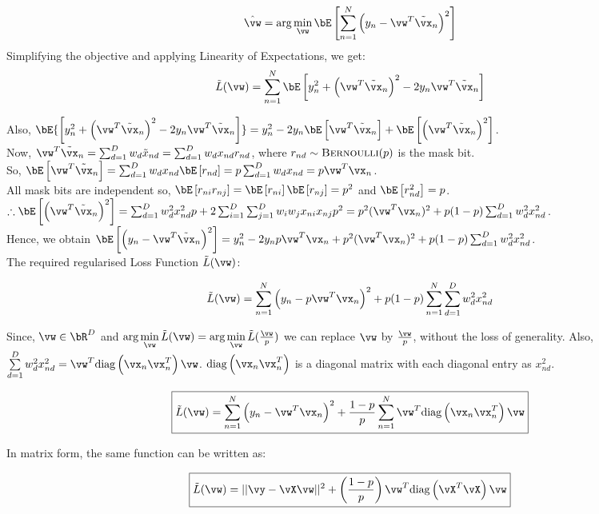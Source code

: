 \documentclass[a4paper,12pt]{article}
\begin{document}
\begin{mlsolution} 

\begin{equation*}
\hat{\vw} = \text{arg} \min\limits_{\vw} \E{ \sum\limits_{n=1}^{N}\br{y_n-\vw^T\Tilde{\vx}_n}^2}
\end{equation*}
Simplifying the objective and applying Linearity of Expectations, we get:
\begin{equation*}
\Tilde{L}(\vw) = \sum\limits_{n=1}^N\E{y_n^2 + \br{\vw^T\Tilde{\vx}_n}^2 - 2y_n\vw^T\Tilde{\vx}_n}
\end{equation*}

Also, $\bE{\bs{y_n^2 + \br{\vw^T\Tilde{\vx}_n}^2 - 2y_n\vw^T\Tilde{\vx}_n}}=y_n^2 -2y_n\bE\bs{\vw^T\Tilde{\vx}_n} + \bE\bs{\br{\vw^T\Tilde{\vx}_n}^2}
$.\\

Now, $\vw^T\Tilde{\vx}_n=\sum_{d=1}^Dw_d\Tilde{x}_{nd}=\sum_{d=1}^Dw_dx_{nd}r_{nd}$, where $r_{nd}\sim\textsc{Bernoulli}(p)$ is the mask bit.\\

So, $\E{\vw^T\Tilde{\vx}_n} = \sum_{d=1}^Dw_dx_{nd}\E{r_{nd}}=p\sum_{d=1}^Dw_dx_{nd} = p\vw^T\vx_n$.\\

All mask bits are independent so, $\E{r_{ni}r_{nj}}=\E{r_{ni}}\E{r_{nj}}=p^2$ and $\E{r_{nd}^2}=p$.\\

$\therefore \E{\br{\vw^T\Tilde{\vx}_n}^2} = \sum_{d=1}^Dw_d^2x_{nd}^2p + 2\sum_{i=1}^D\sum_{j=1}^Dw_iw_jx_{ni}x_{nj}p^2 = p^2(\vw^T\vx_n)^2+p(1-p)\sum_{d=1}^Dw_d^2x_{nd}^2$.\\

Hence, we obtain $\E{\br{y_n-\vw^T\Tilde{\vx}_n}^2} = y_n^2 -2y_np\vw^T\vx_n + p^2(\vw^T\vx_n)^2+p(1-p)\sum_{d=1}^Dw_d^2x_{nd}^2$.\\

The required regularised Loss Function $\Tilde{L}(\vw)$:

\begin{equation*}
\Tilde{L}(\vw) = \sum\limits_{n=1}^N\br{y_n-p\vw^T\vx_n}^2+p(1-p)\sum\limits_{n=1}^N\sum\limits_{d=1}^Dw_d^2x_{nd}^2
\end{equation*}

Since, $\vw \in \bR^D$ and $\text{arg} \min\limits_{\vw}\Tilde{L}(\vw) = \text{arg} \min\limits_{\vw}\Tilde{L}(\frac{\vw}{p})$ we can replace $\vw$ by $\frac{\vw}{p}$, without the loss of generality. Also, $\sum\limits_{d=1}^Dw_d^2x_{nd}^2 = \vw^T\diag\br{\vx_n\vx_n^T}\vw$. $\diag\br{\vx_n\vx_n^T}$ is a diagonal matrix with each diagonal entry as $x_{nd}^2$.

\[
\boxed
{
    \Tilde{L}(\vw) = \sum\limits_{n=1}^N\br{y_n-\vw^T\vx_n}^2+\frac{1-p}{p}\sum\limits_{n=1}^N\vw^T\diag\br{\vx_n\vx_n^T}\vw
}
\]

In matrix form, the same function can be written as:

\[
\boxed
{
    \Tilde{L}(\vw) = ||\vy-\vX\vw||^2+\br{\frac{1-p}{p}}\vw^T\diag\br{\vX^T\vX}\vw
}
\]

\end{mlsolution}
\end{document}
